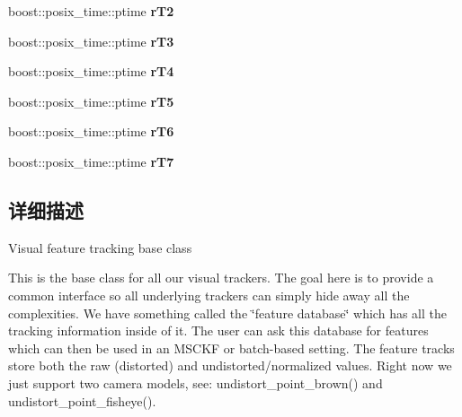 \begin{DoxyCompactItemize}
boost\+::posix\+\_\+time\+::ptime {\bfseries r\+T2}
\item 
\mbox{\label{classov__core_1_1TrackBase_a8e120e3fea132cc8284216f5567938f3}} 
boost\+::posix\+\_\+time\+::ptime {\bfseries r\+T3}
\item 
\mbox{\label{classov__core_1_1TrackBase_a77d86ae2f9d21a3033c15f99b0e34d6e}} 
boost\+::posix\+\_\+time\+::ptime {\bfseries r\+T4}
\item 
\mbox{\label{classov__core_1_1TrackBase_ab57d642985cdbf063dabbd17a2d2e41e}} 
boost\+::posix\+\_\+time\+::ptime {\bfseries r\+T5}
\item 
\mbox{\label{classov__core_1_1TrackBase_acfc1e6bd97b51b95ac4b2283201f395a}} 
boost\+::posix\+\_\+time\+::ptime {\bfseries r\+T6}
\item 
\mbox{\label{classov__core_1_1TrackBase_a03326b3c79412f3f96d4c0a6d9de1e76}} 
boost\+::posix\+\_\+time\+::ptime {\bfseries r\+T7}
\end{DoxyCompactItemize}


\subsection{详细描述}
Visual feature tracking base class 

This is the base class for all our visual trackers. The goal here is to provide a common interface so all underlying trackers can simply hide away all the complexities. We have something called the \char`\"{}feature database\char`\"{} which has all the tracking information inside of it. The user can ask this database for features which can then be used in an M\+S\+C\+KF or batch-\/based setting. The feature tracks store both the raw (distorted) and undistorted/normalized values. Right now we just support two camera models, see\+: undistort\+\_\+point\+\_\+brown() and undistort\+\_\+point\+\_\+fisheye().




